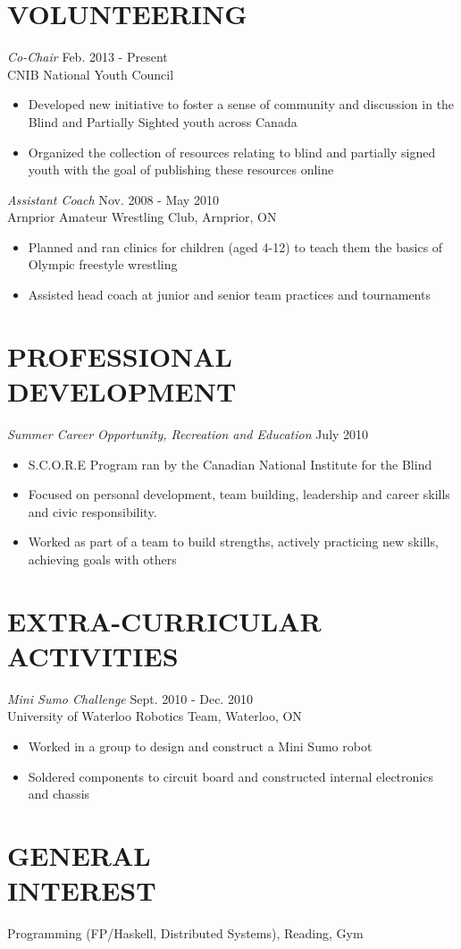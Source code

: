 \documentclass[margin]{res}
\begin{document}
\begin{resume}
\section{VOLUNTEERING}
{\sl Co-Chair} \hfill Feb. 2013 - Present\\
CNIB National Youth Council
\begin{itemize}\itemsep -2pt
  \item Developed new initiative to foster a sense of community and discussion in the Blind and Partially Sighted youth across Canada
  \item Organized the collection of resources relating to blind and partially signed youth with the goal of publishing these resources online
\end{itemize}

{\sl Assistant Coach} \hfill Nov. 2008 - May 2010\\
Arnprior Amateur Wrestling Club, Arnprior, ON
\begin{itemize}\itemsep -2pt
  \item Planned and ran clinics for children (aged 4-12) to teach them the basics of Olympic freestyle wrestling
  \item Assisted head coach at junior and senior team practices and tournaments
\end{itemize}

\section{PROFESSIONAL DEVELOPMENT}
{\sl Summer Career Opportunity, Recreation and Education} \hfill July 2010
\begin{itemize} \itemsep -2pt
  \item S.C.O.R.E Program ran by the Canadian National Institute for the Blind
  \item Focused on personal development, team building, leadership and career skills and civic responsibility.
  \item Worked as part of a team to build strengths, actively practicing new skills, achieving goals with others
\end{itemize}

\section{EXTRA-CURRICULAR \\ ACTIVITIES}
{\it Mini Sumo Challenge}  \hfill Sept. 2010 - Dec. 2010\\
University of Waterloo Robotics Team, Waterloo, ON
\begin{itemize} \itemsep -2pt
  \item Worked in a group to design and construct a Mini Sumo robot
  \item Soldered components to circuit board and constructed internal electronics and chassis
\end{itemize}

\section{GENERAL\\INTEREST}
Programming (FP/Haskell, Distributed Systems), Reading, Gym

\end{resume}
\end{document}
